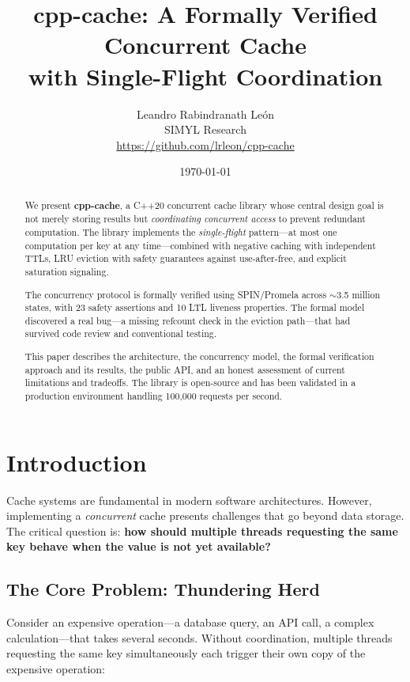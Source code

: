 \documentclass[11pt,a4paper]{article}
\title{cpp-cache: A Formally Verified Concurrent Cache \\
with Single-Flight Coordination}
\author{Leandro Rabindranath Le\'{o}n \\
  \small SIMYL Research \\
  \small \url{https://github.com/lrleon/cpp-cache}}
\date{\today}
\begin{document}
\maketitle

\begin{abstract}
We present \textbf{cpp-cache}, a C++20 concurrent cache library whose
central design goal is not merely storing results but \emph{coordinating
concurrent access} to prevent redundant computation.  The library
implements the \emph{single-flight} pattern---at most one computation
per key at any time---combined with negative caching with independent
TTLs, LRU eviction with safety guarantees against use-after-free, and
explicit saturation signaling.

The concurrency protocol is formally verified using SPIN/Promela across
$\sim$3.5 million states, with 23 safety assertions and 10 LTL liveness
properties.  The formal model discovered a real bug---a missing refcount
check in the eviction path---that had survived code review and
conventional testing.

This paper describes the architecture, the concurrency model, the formal
verification approach and its results, the public API, and an honest
assessment of current limitations and tradeoffs.  The library is
open-source and has been validated in a production environment handling
100,000 requests per second.
\end{abstract}

\section{Introduction}

Cache systems are fundamental in modern software architectures.  However,
implementing a \emph{concurrent} cache presents challenges that go beyond
data storage.  The critical question is: \textbf{how should multiple
threads requesting the same key behave when the value is not yet
available?}

\subsection{The Core Problem: Thundering Herd}

Consider an expensive operation---a database query, an API call, a
complex calculation---that takes several seconds.  Without coordination,
multiple threads requesting the same key simultaneously each trigger
their own copy of the expensive operation:
\end{document}
